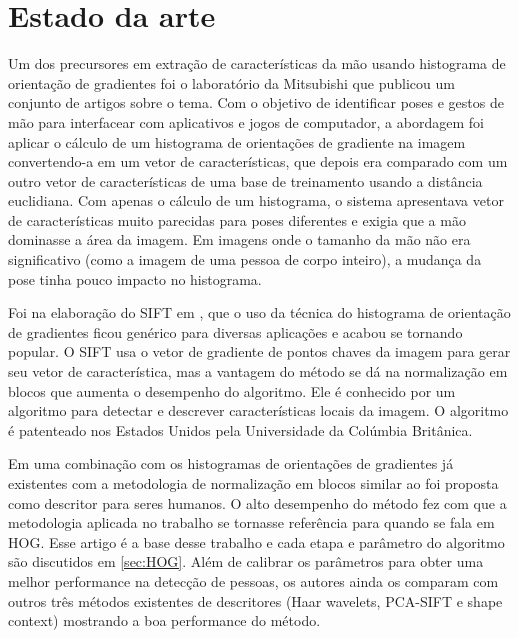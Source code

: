 \section{Estado da arte}

Um dos precursores em extração de características da mão usando histograma de orientação de gradientes foi o laboratório da Mitsubishi que publicou um conjunto de artigos \cite{freeman1995orientation, freeman1996computer} sobre o tema. Com o objetivo de identificar poses e gestos de mão para interfacear com aplicativos e jogos de computador, a abordagem foi aplicar o cálculo de um histograma de orientações de gradiente na imagem convertendo-a em um vetor de características, que depois era comparado com um outro vetor de características de uma base de treinamento usando a distância euclidiana. Com apenas o cálculo de um histograma, o sistema apresentava vetor de características muito parecidas para poses diferentes e exigia que a mão dominasse a área da imagem. Em imagens onde o tamanho da mão não era significativo (como a imagem de uma pessoa de corpo inteiro), a mudança da pose tinha pouco impacto no histograma.

Foi na elaboração do SIFT em \cite{lowe2004distinctive}, que o uso da técnica do histograma de orientação de gradientes ficou genérico para diversas aplicações e acabou se tornando popular. O SIFT usa o vetor de gradiente de pontos chaves da imagem para gerar seu vetor de característica, mas a vantagem do método se dá na normalização em blocos que aumenta o desempenho do algoritmo. Ele é conhecido por um algoritmo para detectar e descrever características locais da imagem. O algoritmo é patenteado nos Estados Unidos pela Universidade da Colúmbia Britânica.

Em \cite{dalal2005histograms} uma combinação com os histogramas de orientações de gradientes já existentes com a metodologia de normalização em blocos similar ao \cite{lowe2004distinctive} foi proposta como descritor para seres humanos. O alto desempenho do método fez com que a metodologia aplicada no trabalho se tornasse referência para quando se fala em HOG.  Esse artigo é a base desse trabalho e cada etapa e parâmetro do algoritmo são discutidos em \ref{sec:HOG}. Além de calibrar os parâmetros para obter uma melhor performance na detecção de pessoas, os autores ainda os comparam com outros três métodos existentes de descritores (Haar wavelets, PCA-SIFT e shape context) mostrando a boa performance do método.

